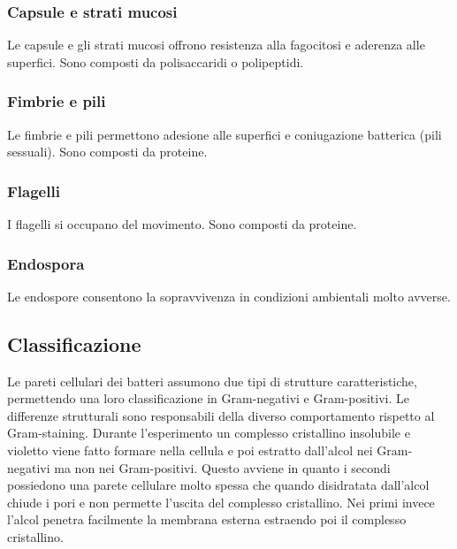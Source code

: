 \subsubsection{Capsule e strati mucosi}
Le capsule e gli strati mucosi offrono resistenza alla fagocitosi e aderenza alle superfici. Sono composti da polisaccaridi o polipeptidi. 
\subsubsection{Fimbrie e pili}
Le fimbrie e pili permettono adesione alle superfici e coniugazione batterica (pili sessuali). Sono composti da proteine.
\subsubsection{Flagelli}
I flagelli si occupano del movimento. Sono composti da proteine.
\subsubsection{Endospora}
Le endospore consentono la sopravvivenza in condizioni ambientali molto avverse. 
\subsection{Classificazione}
Le pareti cellulari dei batteri assumono due tipi di strutture caratteristiche, permettendo una loro classificazione in Gram-negativi e Gram-positivi. Le differenze strutturali sono
responsabili della diverso comportamento rispetto al Gram-staining. Durante l'esperimento un complesso cristallino insolubile e violetto viene fatto formare nella cellula e poi 
estratto dall'alcol nei Gram-negativi ma non nei Gram-positivi. Questo avviene in quanto i secondi possiedono una parete cellulare molto spessa che quando disidratata dall'alcol chiude
i pori e non permette l'uscita del complesso cristallino. Nei primi invece l'alcol penetra facilmente la membrana esterna estraendo poi il complesso cristallino. 
